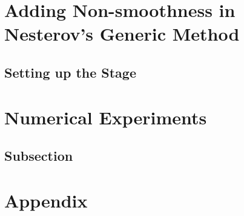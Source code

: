 \documentclass[]{article}
\theoremstyle{definition}
\numberwithin{equation}{subsection}
\begin{document}

\section{Adding Non-smoothness in Nesterov's Generic Method}

    \subsection{Setting up the Stage}


\section{Numerical Experiments}\label{sec:numerics}
    
    \subsection{Subsection}
\appendix

\section{Appendix} 
    





\end{document}
